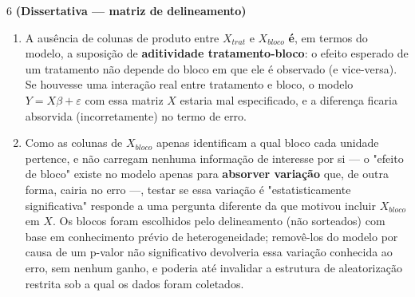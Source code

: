 \documentclass[11pt]{article}
\begin{document}
\begin{questao}{6} \textbf{(Dissertativa --- matriz de delineamento)}
\end{questao}
\begin{solucao}
\begin{enumerate}[label=(\alph*)]
  \item A ausência de colunas de produto entre $X_{trat}$ e $X_{bloco}$ \textbf{é}, em termos do
    modelo, a suposição de \textbf{aditividade tratamento-bloco}: o efeito esperado de um
    tratamento não depende do bloco em que ele é observado (e vice-versa). Se houvesse uma
    interação real entre tratamento e bloco, o modelo $Y=X\beta+\varepsilon$ com essa matriz $X$
    estaria mal especificado, e a diferença ficaria absorvida (incorretamente) no termo de erro.
  \item Como as colunas de $X_{bloco}$ apenas identificam a qual bloco cada unidade pertence, e
    não carregam nenhuma informação de interesse por si — o "efeito de bloco" existe no modelo
    apenas para \textbf{absorver variação} que, de outra forma, cairia no erro —, testar se essa
    variação é "estatisticamente significativa" responde a uma pergunta diferente da que motivou
    incluir $X_{bloco}$ em $X$. Os blocos foram escolhidos pelo delineamento (não sorteados) com
    base em conhecimento prévio de heterogeneidade; removê-los do modelo por causa de um p-valor
    não significativo devolveria essa variação conhecida ao erro, sem nenhum ganho, e poderia até
    invalidar a estrutura de aleatorização restrita sob a qual os dados foram coletados.
\end{enumerate}
\end{solucao}
\end{document}

